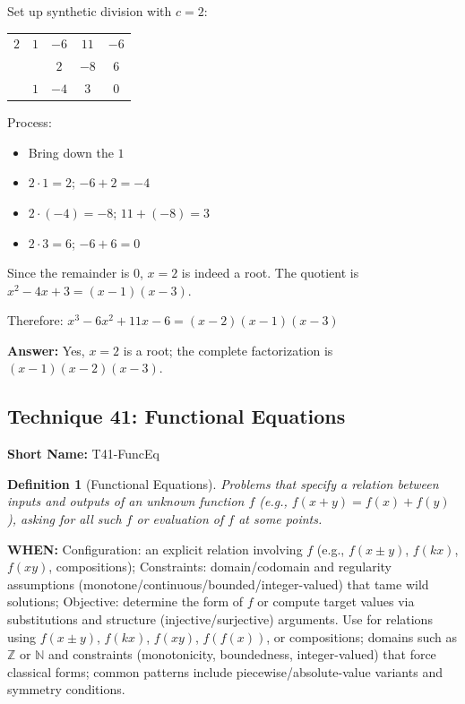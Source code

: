 \documentclass[12pt]{article}
\newtheorem{definition}{Definition}[section]
\newenvironment{solution}
{\begin{tcolorbox}[colback=green!5!white,colframe=green!75!black,title={Solution}]}{\end{tcolorbox}}
\begin{document}
\begin{solution}
Set up synthetic division with $c = 2$:

\begin{center}
\begin{tabular}{c|cccc}
$2$ & $1$ & $-6$ & $11$ & $-6$ \\
    &     & $2$  & $-8$ & $6$ \\
\hline
    & $1$ & $-4$ & $3$  & $0$ \\
\end{tabular}
\end{center}

Process:
\begin{itemize}
    \item Bring down the $1$
    \item $2 \cdot 1 = 2$; $-6 + 2 = -4$
    \item $2 \cdot (-4) = -8$; $11 + (-8) = 3$
    \item $2 \cdot 3 = 6$; $-6 + 6 = 0$
\end{itemize}

Since the remainder is $0$, $x = 2$ is indeed a root.
The quotient is $x^2 - 4x + 3 = (x - 1)(x - 3)$.

Therefore: $x^3 - 6x^2 + 11x - 6 = (x - 2)(x - 1)(x - 3)$

\textbf{Answer:} Yes, $x = 2$ is a root; the complete factorization is $(x - 1)(x - 2)(x - 3)$.
\end{solution}

\subsection{Technique 41: Functional Equations}
\textbf{Short Name:} T41-FuncEq

\begin{definition}[Functional Equations]
Problems that specify a relation between inputs and outputs of an unknown function $f$ (e.g., $f(x+y)=f(x)+f(y)$), asking for all such $f$ or evaluation of $f$ at some points.
\end{definition}

\textbf{WHEN:} Configuration: an explicit relation involving $f$ (e.g., $f(x\pm y)$, $f(kx)$, $f(xy)$, compositions); Constraints: domain/codomain and regularity assumptions (monotone/continuous/bounded/integer-valued) that tame wild solutions; Objective: determine the form of $f$ or compute target values via substitutions and structure (injective/surjective) arguments. Use for relations using $f(x\pm y)$, $f(kx)$, $f(xy)$, $f(f(x))$, or compositions; domains such as $\mathbb{Z}$ or $\mathbb{N}$ and constraints (monotonicity, boundedness, integer-valued) that force classical forms; common patterns include piecewise/absolute-value variants and symmetry conditions.
\end{document}
